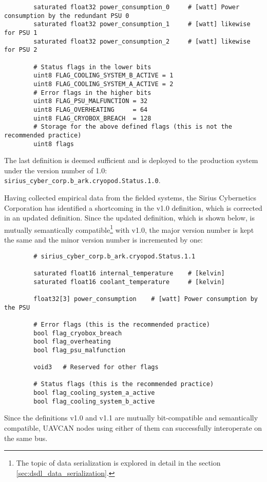 \begin{remark}[breakable]
\begin{verbatim}
        saturated float32 power_consumption_0     # [watt] Power consumption by the redundant PSU 0
        saturated float32 power_consumption_1     # [watt] likewise for PSU 1
        saturated float32 power_consumption_2     # [watt] likewise for PSU 2

        # Status flags in the lower bits
        uint8 FLAG_COOLING_SYSTEM_B_ACTIVE = 1
        uint8 FLAG_COOLING_SYSTEM_A_ACTIVE = 2
        # Error flags in the higher bits
        uint8 FLAG_PSU_MALFUNCTION = 32
        uint8 FLAG_OVERHEATING     = 64
        uint8 FLAG_CRYOBOX_BREACH  = 128
        # Storage for the above defined flags (this is not the recommended practice)
        uint8 flags
    \end{verbatim}

    The last definition is deemed sufficient and is deployed to the production system
    under the version number of 1.0: \verb|sirius_cyber_corp.b_ark.cryopod.Status.1.0|.

    Having collected empirical data from the fielded systems, the Sirius Cybernetics Corporation has
    identified a shortcoming in the v1.0 definition, which is corrected in an updated definition.
    Since the updated definition, which is shown below, is mutually semantically
    compatible\footnote{The topic of data serialization is explored in detail in the section
    \ref{sec:dsdl_data_serialization}.}
    with v1.0, the major version number is kept the same and the minor version number is incremented by one:

    \begin{verbatim}
        # sirius_cyber_corp.b_ark.cryopod.Status.1.1

        saturated float16 internal_temperature    # [kelvin]
        saturated float16 coolant_temperature     # [kelvin]

        float32[3] power_consumption    # [watt] Power consumption by the PSU

        # Error flags (this is the recommended practice)
        bool flag_cryobox_breach
        bool flag_overheating
        bool flag_psu_malfunction

        void3   # Reserved for other flags

        # Status flags (this is the recommended practice)
        bool flag_cooling_system_a_active
        bool flag_cooling_system_b_active
    \end{verbatim}

    Since the definitions v1.0 and v1.1 are mutually bit-compatible and semantically compatible,
    UAVCAN nodes using either of them can successfully interoperate on the same bus.


\end{remark}
